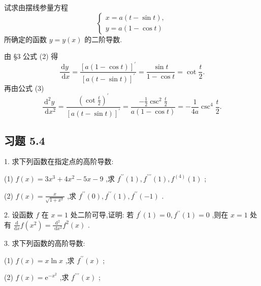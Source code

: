 \begin{example}

\end{example}
试求由摆线参量方程
\[
\left\{  \begin{array}{l} x = a\left( {t - \sin t}\right) , \\  y = a\left( {1 - \cos t}\right)  \end{array}\right.
\]
所确定的函数 \(y = y\left( x\right)\) 的二阶导数.

\begin{solution}
由 §3 公式 (2) 得
\[
\frac{\mathrm{d}y}{\mathrm{\;d}x} = \frac{{\left\lbrack  a\left( 1 - \cos t\right) \right\rbrack  }^{\prime }}{{\left\lbrack  a\left( t - \sin t\right) \right\rbrack  }^{\prime }} = \frac{\sin t}{1 - \cos t} = \cot \frac{t}{2}.
\]
再由公式 (3)
\[
\frac{{\mathrm{d}}^{2}y}{\mathrm{\;d}{x}^{2}} = \frac{{\left( \cot \frac{t}{2}\right) }^{\prime }}{{\left\lbrack  a\left( t - \sin t\right) \right\rbrack  }^{\prime }} = \frac{-\frac{1}{2}{\csc }^{2}\frac{t}{2}}{a\left( {1 - \cos t}\right) } =  - \frac{1}{4a}{\csc }^{4}\frac{t}{2}.
\]
\end{solution}

\subsection{习题 5.4}

1. 求下列函数在指定点的高阶导数:

(1) \(f\left( x\right)  = 3{x}^{3} + 4{x}^{2} - {5x} - 9\) ,求 \({f}^{\prime \prime }\left( 1\right) ,{f}^{\prime \prime \prime }\left( 1\right) ,{f}^{\left( 4\right) }\left( 1\right)\) ;

(2) \(f\left( x\right)  = \frac{x}{\sqrt{1 + {x}^{2}}}\) ,求 \({f}^{\prime \prime }\left( 0\right) ,{f}^{\prime \prime }\left( 1\right) ,{f}^{\prime \prime }\left( {-1}\right)\) .

2. 设函数 \(f\) 在 \(x = 1\) 处二阶可导,证明: 若 \({f}^{\prime }\left( 1\right)  = 0,{f}^{\prime \prime }\left( 1\right)  = 0\) ,则在 \(x = 1\) 处有 \(\frac{\mathrm{d}}{\mathrm{d}x}f\left( {x}^{2}\right)  = \frac{{\mathrm{d}}^{2}}{\mathrm{\;d}{x}^{2}}{f}^{2}\left( x\right)\) .

3. 求下列函数的高阶导数:

(1) \(f\left( x\right)  = x\ln x\) ,求 \({f}^{\prime \prime }\left( x\right)\) ;

(2) \(f\left( x\right)  = {\mathrm{e}}^{-{x}^{2}}\) ,求 \({f}^{\prime \prime \prime }\left( x\right)\) ;

